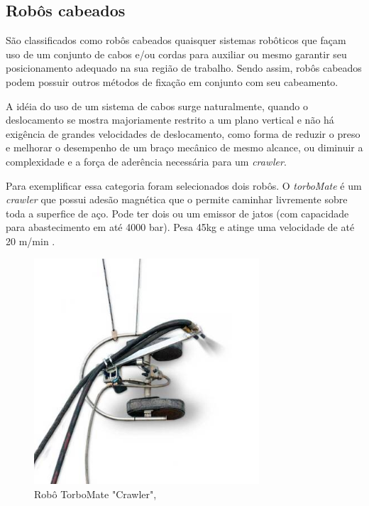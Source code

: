 \subsection{Robôs cabeados}

São classificados como robôs cabeados quaisquer sistemas robôticos que façam
uso de um conjunto de cabos e/ou cordas para auxiliar ou mesmo garantir seu
posicionamento adequado na sua região de trabalho. Sendo assim, robôs cabeados
podem possuir outros métodos de fixação em conjunto com seu cabeamento.

A idéia do uso de um sistema de cabos surge naturalmente, quando o deslocamento
se mostra majoriamente restrito a um plano vertical e não há exigência de
grandes velocidades de deslocamento, como forma de reduzir o preso e melhorar o
desempenho de um braço mecânico de mesmo alcance, ou diminuir a complexidade e
a força de aderência necessária para um \textit{crawler}.

Para exemplificar essa categoria foram selecionados dois robôs. O
\textit{torboMate} é um \textit{crawler} que possui adesão magnética que o
permite caminhar livremente sobre toda a superfice de aço. Pode ter dois ou um
emissor de jatos (com capacidade para abastecimento em até 4000 bar). Pesa 45kg
e atinge uma velocidade de até 20 m/min \citep{torbo}.

\begin{figure}[ht]
	\centering
	\includegraphics[width=8.4cm]{figs/cables/torbo}
	\caption{Robô TorboMate "Crawler", \cite{torbo}}
	\label{fig:cables:torbo}
\end{figure}

